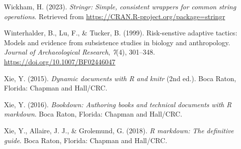 \documentclass[
  ,man,mask,floatsintext]{apa6}
\newlength{\cslhangindent}
\newlength{\cslentryspacingunit} %
\newenvironment{CSLReferences}[2] %
 {%
  \setlength{\parindent}{0pt}
  \ifodd #1
  \let\oldpar\par
  \def\par{\hangindent=\cslhangindent\oldpar}
  \fi
  \setlength{\parskip}{#2\cslentryspacingunit}
 }%
 {}
\begin{document}
\begin{CSLReferences}{1}{0}
\leavevmode{}%
Wickham, H. (2023). \emph{Stringr: Simple, consistent wrappers for common string operations}. Retrieved from \url{https://CRAN.R-project.org/package=stringr}

\leavevmode{}%
Winterhalder, B., Lu, F., \& Tucker, B. (1999). Risk-senstive adaptive tactics: {Models} and evidence from subsistence studies in biology and anthropology. \emph{Journal of Archaeological Research}, \emph{7}(4), 301--348. \url{https://doi.org/10.1007/BF02446047}

\leavevmode{}%
Xie, Y. (2015). \emph{Dynamic documents with {R} and knitr} (2nd ed.). Boca Raton, Florida: {Chapman and Hall/CRC}.

\leavevmode{}%
Xie, Y. (2016). \emph{Bookdown: {Authoring} books and technical documents with {R} markdown}. Boca Raton, Florida: {Chapman and Hall/CRC}.

\leavevmode{}%
Xie, Y., Allaire, J. J., \& Grolemund, G. (2018). \emph{R markdown: {The} definitive guide}. Boca Raton, Florida: {Chapman and Hall/CRC}.

\end{CSLReferences}
\end{document}
